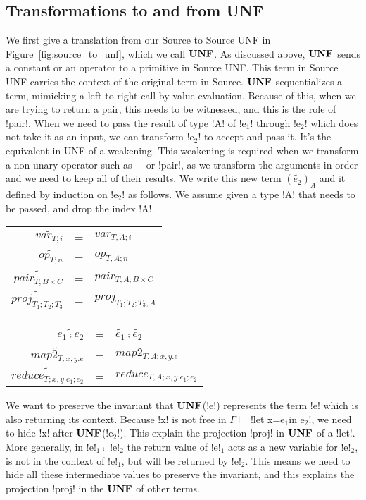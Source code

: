 

\subsection{Transformations to and from UNF} %
\label{sub:transformations to and from UNF}

We first give a translation from our Source to Source UNF in Figure~\ref{fig:source_to_unf}, which we call $\mathbf{UNF}$.
As discussed above, $\mathbf{UNF}$ sends a constant or an operator to a primitive in Source UNF. 
This term in Source UNF carries the context of the original term in Source.
$\mathbf{UNF}$ sequentializes a term, mimicking a left-to-right call-by-value evaluation.
Because of this, when we are trying to return a pair, this needs to be witnessed, and this is the role of !pair!.
When we need to pass the result of type !A! of !e$_{1}$! through !e$_{2}$! which does not take it as an input, we can transform !e$_{2}$! to accept and pass it.
It's the equivalent in UNF of a weakening.
This weakening is required when we transform a non-unary operator such as $+$ or !pair!, as we transform the arguments in order and we need to keep all of their results.
We write this new term $(\widetilde{e_{2}})_{A}$ and it defined by induction on !e$_{2}$! as follows. 
We assume given a type !A! that needs to be passed, and drop the index !A!.

\begin{tabular}{r c l}
    $\widetilde{var_{T;i}}$  &=& $var_{T,A;i}$ \\
    $\widetilde{op_{T;n}}$  &=& $op_{T,A;n}$ \\
    $\widetilde{pair_{T;B\times C}}$  &=& $pair_{T,A;B\times C}$ \\
    $\widetilde{proj_{T_1;T_2;T_3}}$  &=& $proj_{T_1;T_2;T_3,A}$ 
\end{tabular}
\begin{tabular}{r c l}
    $\widetilde{e_1 \comp e_2}$  &=& $\widetilde{e_1}\comp\widetilde{e_2}$ \\
    $\widetilde{map2_{T;x,y.e}}$  &=& $map2_{T,A;x,y.e}$ \\
    $\widetilde{reduce_{T;x,y.e_1;e_2}}$ &=& $reduce_{T,A;x,y.e_1;e_2}$
\end{tabular}

We want to preserve the invariant that $\mathbf{UNF}$(!e!) represents the term !e! which is also returning its context. 
Because !x! is not free in $\Gamma \vdash$ !let x=e$_1$in e$_2$!, we need to hide !x! after $\mathbf{UNF}$(!e$_2$!).
This explain the projection !proj! in $\mathbf{UNF}$ of a !let!. 
More generally, in !e!$_{1} \comp$ !e!$_{2}$ the return value of !e!$_{1}$ acts as a new variable for !e!$_{2}$, 
is not in the context of !e!$_{1}$, but will be returned by !e!$_{2}$.
This means we need to hide all these intermediate values to preserve the invariant,
and this explains the projection !proj! in the $\mathbf{UNF}$ of other terms. 

